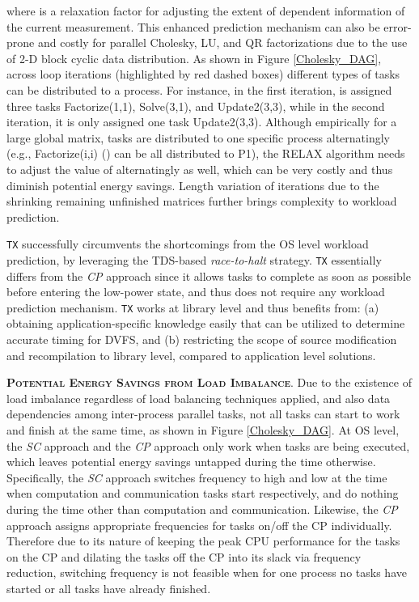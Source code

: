 \documentclass[12pt]{elsarticle}
\begin{document}
\noindent where  is a relaxation factor for adjusting the extent of dependent information of the current measurement. This enhanced prediction mechanism can also be error-prone and costly for parallel Cholesky, LU, and QR factorizations due to the use of 2-D block cyclic data distribution. As shown in Figure \ref{Cholesky_DAG}, across loop iterations (highlighted by red dashed boxes) different types of tasks can be distributed to a process. For instance, in the first iteration,  is assigned three tasks \textsf{Factorize(1,1)}, \textsf{Solve(3,1)}, and \textsf{Update2(3,3)}, while in the second iteration, it is only assigned one task \textsf{Update2(3,3)}. Although empirically for a large global matrix, tasks are distributed to one specific process alternatingly (e.g., \textsf{Factorize(i,i)} () can be all distributed to \textsf{P1}), the RELAX algorithm needs to adjust the value of  alternatingly as well, which can be very costly and thus diminish potential energy savings. Length variation of iterations due to the shrinking remaining unfinished matrices further brings complexity to workload prediction.

\texttt{TX} successfully circumvents the shortcomings from the OS level workload prediction, by leveraging the TDS-based \emph{race-to-halt} strategy. \texttt{TX} essentially differs from the \emph{CP} approach since it allows tasks to complete as soon as possible before entering the low-power state, and thus does not require any workload prediction mechanism. \texttt{TX} works at library level and thus benefits from: (a) obtaining application-specific knowledge easily that can be utilized to determine accurate timing for DVFS, and (b) restricting the scope of source modification and recompilation to library level, compared to application level solutions.

\vspace{1mm}
\noindent\textsc{\textbf{Potential Energy Savings from Load Imbalance}}. Due to the existence of load imbalance regardless of load balancing techniques applied, and also data dependencies among inter-process parallel tasks, not all tasks can start to work and finish at the same time, as shown in Figure \ref{Cholesky_DAG}. At OS level, the \emph{SC} approach and the \emph{CP} approach only work when tasks are being executed, which leaves potential energy savings untapped during the time otherwise. Specifically, the \emph{SC} approach switches frequency to high and low at the time when computation and communication tasks start respectively, and do nothing during the time other than computation and communication. Likewise, the \emph{CP} approach assigns appropriate frequencies for tasks on/off the CP individually. Therefore due to its nature of keeping the peak CPU performance for the tasks on the CP and dilating the tasks off the CP into its slack via frequency reduction, switching frequency is not feasible when for one process no tasks have started or all tasks have already finished.
\end{document}

